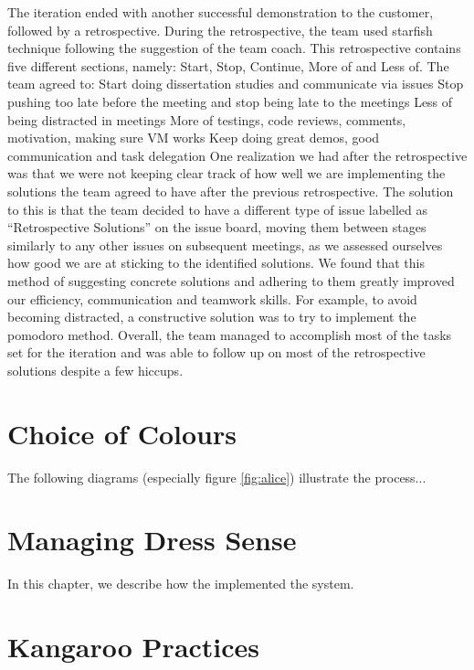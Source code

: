 \documentclass{l3proj}
\begin{document}
The iteration ended with another successful demonstration to the customer, followed by a retrospective. During the retrospective, the team used starfish technique following the suggestion of the team coach. This retrospective contains five different sections, namely: Start, Stop, Continue, More of and Less of. The team agreed to:
Start doing dissertation studies and communicate via issues
Stop pushing too late before the meeting and stop being late to the meetings
Less of being distracted in meetings
More of testings, code reviews, comments, motivation, making sure VM works
Keep doing great demos, good communication and task delegation
One realization we had after the retrospective was that we were not keeping clear track of how well we are implementing the solutions the team agreed to have after the previous retrospective. The solution to this is that the team decided to have a different type of issue labelled as “Retrospective Solutions” on the issue board, moving them between stages similarly to any other issues on subsequent meetings, as we assessed ourselves how good we are at sticking to the identified solutions. We found that this method of suggesting concrete solutions and adhering to them greatly improved our efficiency, communication and teamwork skills. For example, to avoid becoming distracted, a constructive solution was to try to implement the pomodoro method. Overall, the team managed to accomplish most of the tasks set for the iteration and was able to follow up on most of the retrospective solutions despite a few hiccups.

\section{Choice of Colours}
\label{design}

The following diagrams (especially figure \ref{fig:alice}) illustrate the
process...

\section{Managing Dress Sense}
\label{managing}

In this chapter, we describe how the implemented the system.

\section{Kangaroo Practices}
\end{document}
